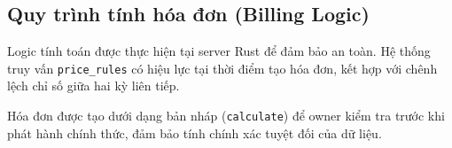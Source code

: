 \subsection{Quy trình tính hóa đơn (Billing Logic)}

Logic tính toán được thực hiện tại server Rust để đảm bảo an toàn. Hệ thống truy vấn \texttt{price\_rules} có hiệu lực tại thời điểm tạo hóa đơn, kết hợp với chênh lệch chỉ số giữa hai kỳ liên tiếp.

Hóa đơn được tạo dưới dạng bản nháp (\texttt{calculate}) để owner kiểm tra trước khi phát hành chính thức, đảm bảo tính chính xác tuyệt đối của dữ liệu.
